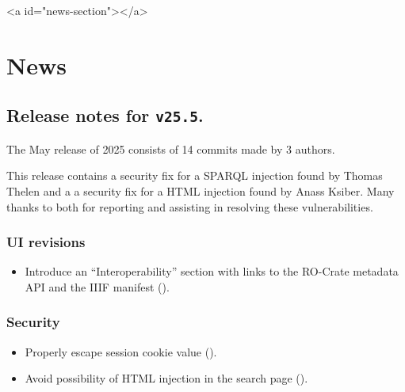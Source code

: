 \ifdefined\HCode
\begin{html}
<a id="news-section"></a>
\end{html}
\fi
\chapter*{News}

\section*{Release notes for \texttt{v25.5}.}

  The May release of 2025 consists of 14 commits made by 3 authors.

  This release contains a security fix for a SPARQL injection found by Thomas
  Thelen and a a security fix for a HTML injection found by Anass Ksiber.  Many
  thanks to both for reporting and assisting in resolving these vulnerabilities.

\subsection*{UI revisions}
\begin{itemize}
\item{Introduce an ``Interoperability'' section with links to the RO-Crate
    metadata API and the IIIF manifest
    ().}
\end{itemize}

\subsection*{Security}
\begin{itemize}
\item{Properly escape session cookie value
    ().}
\item{Avoid possibility of HTML injection in the search page
    ().}
\end{itemize}

